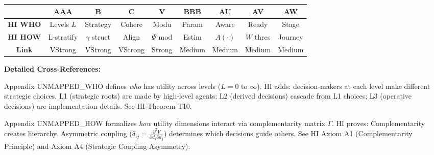 
\begin{tcolorbox}[colback=white, colframe=black,
    title=\textbf{10C Integration: How HI CORE-HIERARCHY Connects to Other COREs}]

\begin{center}
\small
\begin{tabular}{@{}c|cccccccc@{}}
\toprule
& \textbf{AAA} & \textbf{B} & \textbf{C} & \textbf{V} & \textbf{BBB} & \textbf{AU} & \textbf{AV} & \textbf{AW} \\
\midrule
\textbf{HI \textbf{WHO}} & Levels $L$ & Strategy & Cohere & Modu & Param & Aware & Ready & Stage \\
\textbf{HI \textbf{HOW}} & L-stratify & $\gamma$ struct & Align & $\Psi$ mod & Estim & $A(\cdot)$ & $W$ thres & Journey \\
\midrule
\textbf{Link} & \cellcolor{red!20}VStrong & \cellcolor{red!20}VStrong & \cellcolor{red!20}VStrong & \cellcolor{red!20}Strong & \cellcolor{yellow!20}Medium & \cellcolor{yellow!20}Medium & \cellcolor{yellow!20}Medium & \cellcolor{yellow!20}Medium \\
\bottomrule
\end{tabular}
\end{center}

\textbf{Detailed Cross-References:}

\begin{description}[style=nextline, labelindent=0pt, leftmargin=1.5cm]

\item[\textbf{AAA (CORE-WHO)}]
Appendix UNMAPPED_WHO defines \textit{who} has utility across levels ($L=0$ to $\infty$). HI adds: decision-makers at each level make different strategic choices. L1 (strategic roots) are made by high-level agents; L2 (derived decisions) cascade from L1 choices; L3 (operative decisions) are implementation details. See HI Theorem T10.

\item[\textbf{B (CORE-HOW)}]
Appendix UNMAPPED_HOW formalizes \textit{how} utility dimensions interact via complementarity matrix $\Gamma$. HI proves: Complementarity creates hierarchy. Asymmetric coupling ($\delta_{ij} = \frac{\partial^2 V}{\partial d_i \partial d_j}$) determines which decisions guide others. See HI Axiom A1 (Complementarity Principle) and Axiom A4 (Strategic Coupling Asymmetry).


\end{description}
\end{tcolorbox}
